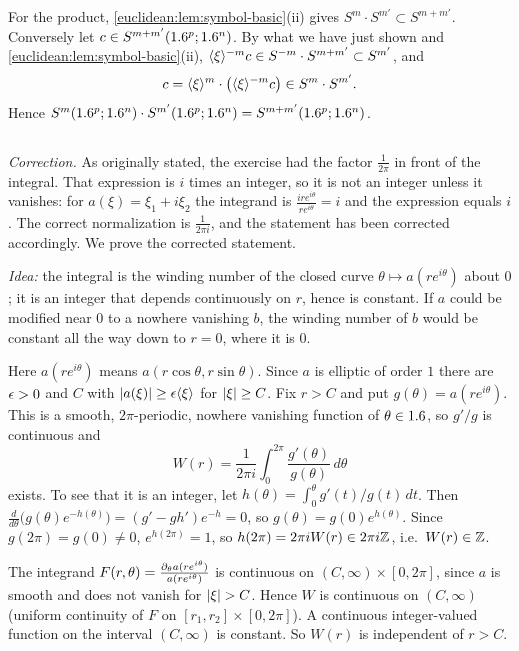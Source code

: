 For the product, \cref{euclidean:lem:symbol-basic}(ii) gives
$S^m\cdot S^{m'}\subset S^{m+m'}$. Conversely let $c\in S^{m+m'}(1.6^p;1.6^n)$. By what we
have just shown and \cref{euclidean:lem:symbol-basic}(ii),
$\langle \xi\rangle^{-m}c\in S^{-m}\cdot S^{m+m'}\subset S^{m'}$, and
\begin{equation*}
  c=\langle \xi\rangle^m\cdot\bigl(\langle \xi\rangle^{-m}c\bigr)\in S^m\cdot S^{m'}.
\end{equation*}
Hence $S^m(1.6^p;1.6^n)\cdot S^{m'}(1.6^p;1.6^n)=S^{m+m'}(1.6^p;1.6^n)$.

\subsection*{}

\emph{Correction.} As originally stated, the exercise had the factor $\frac1{2\pi}$ in
front of the integral. That expression is $i$ times an integer, so it is not an integer
unless it vanishes: for $a(\xi)=\xi_1+i\xi_2$ the integrand is
$\frac{ire^{i\theta}}{re^{i\theta}}=i$ and the expression equals $i$. The correct
normalization is $\frac1{2\pi i}$, and the statement has been corrected accordingly. We
prove the corrected statement.

\emph{Idea:} the integral is the winding number of the closed curve
$\theta\mapsto a(re^{i\theta})$ about $0$; it is an integer that depends continuously on
$r$, hence is constant. If $a$ could be modified near $0$ to a nowhere vanishing $b$,
the winding number of $b$ would be constant all the way down to $r=0$, where it is $0$.

Here $a(re^{i\theta})$ means $a(r\cos\theta,r\sin\theta)$. Since $a$ is elliptic of
order $1$ there are $\epsilon>0$ and $C$ with $\lvert a(\xi)\rvert\ge\epsilon\langle \xi\rangle$ for $\lvert \xi\rvert\ge C$.
Fix $r>C$ and put $g(\theta)=a(re^{i\theta})$. This is a smooth, $2\pi$-periodic,
nowhere vanishing function of $\theta\in1.6$, so $g'/g$ is continuous and
\begin{equation*}
  W(r)=\frac1{2\pi i}\int_0^{2\pi}\frac{g'(\theta)}{g(\theta)}\,d\theta
\end{equation*}
exists. To see that it is an integer, let
$h(\theta)=\int_0^\theta g'(t)/g(t)\,dt$. Then
$\frac d{d\theta}\bigl(g(\theta)e^{-h(\theta)}\bigr)=(g'-gh')e^{-h}=0$, so
$g(\theta)=g(0)e^{h(\theta)}$. Since $g(2\pi)=g(0)\ne0$, $e^{h(2\pi)}=1$, so
$h(2\pi)=2\pi iW(r)\in2\pi i\mathbb{Z}$, i.e.\ $W(r)\in\mathbb{Z}$.

The integrand
$F(r,\theta)=\frac{\partial_\theta a(re^{i\theta})}{a(re^{i\theta})}$ is continuous on
$(C,\infty)\times[0,2\pi]$, since $a$ is smooth and does not vanish for $\lvert \xi\rvert>C$. Hence
$W$ is continuous on $(C,\infty)$ (uniform continuity of $F$ on
$[r_1,r_2]\times[0,2\pi]$). A continuous integer-valued function on the interval
$(C,\infty)$ is constant. So $W(r)$ is independent of $r>C$.


